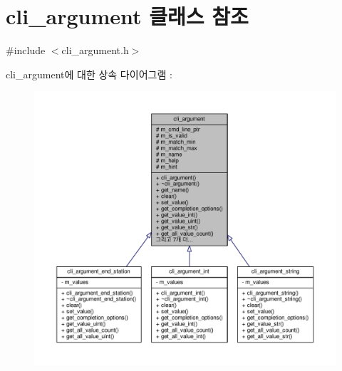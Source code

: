 \hypertarget{classcli__argument}{}\section{cli\+\_\+argument 클래스 참조}
\label{classcli__argument}


{\ttfamily \#include $<$cli\+\_\+argument.\+h$>$}



cli\+\_\+argument에 대한 상속 다이어그램 \+: 
\nopagebreak
\begin{figure}[H]
\begin{center}
\leavevmode
\includegraphics[width=350pt]{classcli__argument__inherit__graph}
\end{center}
\end{figure}


